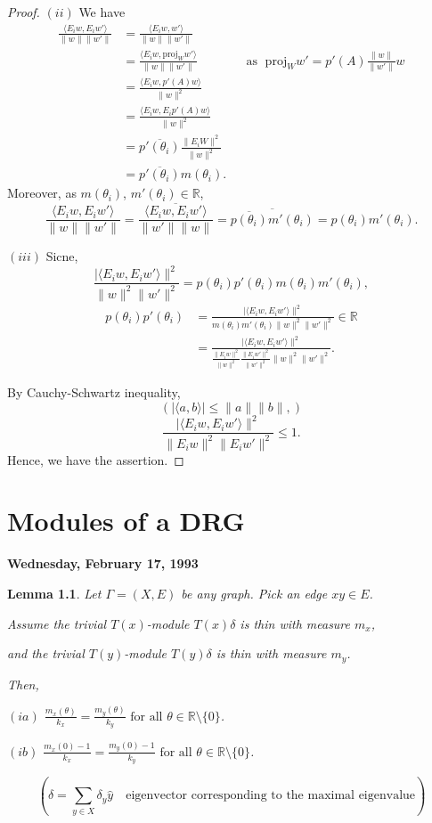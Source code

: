 \documentclass[
]{book}
\newtheorem{lemma}{Lemma}[chapter]
\theoremstyle{definition}
\theoremstyle{definition}
\theoremstyle{definition}
\theoremstyle{definition}
\theoremstyle{remark}
\begin{document}
\begin{proof}
\((ii)\) We have
\begin{align}
\frac{\langle E_iw, E_iw'\rangle}{\|w\|\|w'\|}
& = \frac{\langle E_iw, w'\rangle}{\|w\|\|w'\|}\\
& = \frac{\langle E_iw, \mathrm{proj}_W w'\rangle}{\|w\|\|w'\|} && \text{as }\; \mathrm{proj}_Ww' = p'(A)\frac{\|w\|}{\|w'\|}w\\
& = \frac{\langle E_iw, p'(A) w\rangle}{\|w\|^2}\\
& = \frac{\langle E_iw, E_ip'(A) w\rangle}{\|w\|^2}\\
& = \overline{p'(\theta_i)}\frac{\|E_iW\|^2}{\|w\|^2}\\
& = \overline{p'(\theta_i)}m(\theta_i).
\end{align}
Moreover, as \(m(\theta_i)\), \(m'(\theta_i)\in \mathbb{R}\),
\[\frac{\langle E_iw, E_iw'\rangle}{\|w\|\|w'\|}  = \frac{\overline{\langle E_iw, E_iw'\rangle}}{\|w'\|\|w\|}
 = \overline{\overline{p(\theta_i)}m'(\theta_i)} 
 = p(\theta_i)m'(\theta_i).\]

\((iii)\) Sicne,
\[\frac{|\langle E_iw, E_iw'\rangle\|^2}{\|w\|^2\|w'\|^2} = p(\theta_i)p'(\theta_i)m(\theta_i)m'(\theta_i),\]
\begin{align}
p(\theta_i)p'(\theta_i) & = \frac{|\langle E_iw, E_iw'\rangle\|^2}{m(\theta_i)m'(\theta_i)\|w\|^2\|w'\|^2} \in \mathbb{R}\\
& = \frac{|\langle E_iw, E_iw'\rangle\|^2}{\frac{\|E_iw\|^2}{\|w\|^2}\frac{\|E_iw'\|^2}{\|w'\|^2}\|w\|^2\|w'\|^2}.
\end{align}

By Cauchy-Schwartz inequality,
\[(|\langle a, b\rangle | \leq \|a\|\|b\|,)\]
\[\frac{|\langle E_iw, E_iw'\rangle\|^2}{\|E_iw\|^2\|E_iw'\|^2} \leq 1.\]
Hence, we have the assertion.
\end{proof}

\hypertarget{lec13}{%
\chapter{Modules of a DRG}\label{lec13}}

\textbf{Wednesday, February 17, 1993}

\begin{lemma}
\protect\hypertarget{lem:two-principal-modules}{}\label{lem:two-principal-modules}Let \(\Gamma = (X, E)\) be any graph. Pick an edge \(xy\in E\).

Assume the trivial \(T(x)\)-module \(T(x)\delta\) is thin with measure \(m_x\),

and the trivial \(T(y)\)-module \(T(y)\delta\) is thin with measure \(m_y\).

Then,

\((ia)\) \({\displaystyle \frac{m_x(\theta)}{k_x} = \frac{m_y(\theta)}{k_y} \text{ for all } \theta\in \mathbb{R} \setminus \{0\}}\).

\((ib)\) \({\displaystyle \frac{m_x(0) -1}{k_x} = \frac{m_y(0)-1}{k_y} \text{ for all } \theta\in \mathbb{R} \setminus \{0\}}\).

\[(\delta = \sum_{y\in X}\delta_y \hat{y} \quad \text{eigenvector corresponding to the maximal eigenvalue})\]
\end{lemma}
\end{document}
